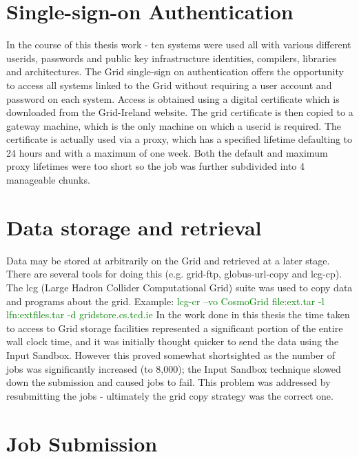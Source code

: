 \section{Single-sign-on Authentication}
In the course of this thesis work - ten systems were used all with various different userids, passwords and public key infrastructure identities, compilers, libraries and architectures. 
The Grid single-sign on authentication offers the opportunity to access all systems linked to the Grid without requiring a user account and password on each system.
Access is obtained using a digital certificate which is downloaded from the Grid-Ireland website.
The grid certificate is then copied to a gateway machine, which is the only machine on which a userid is required.
The certificate is actually used via a proxy, which has a specified lifetime defaulting to 24 hours and with a maximum of one week.
Both the default and maximum proxy lifetimes were too short so the job was further subdivided into 4 manageable chunks.

\section{Data storage and retrieval}
Data may be stored at arbitrarily on the Grid and retrieved at a later stage. 
There are several tools for doing this (e.g. grid-ftp, globus-url-copy and lcg-cp).
The lcg (Large Hadron Collider Computational Grid) suite was used to copy data and programs about the grid.
Example:
\textcolor{green}
{\textsf {
lcg-cr --vo CosmoGrid file:ext.tar  -l lfn:extfiles.tar -d gridstore.cs.tcd.ie
}}
In the work done in this thesis the time taken to access to Grid storage facilities represented a significant portion of the entire wall clock time, and it was initially thought quicker to send the data using the Input Sandbox.
However this proved somewhat shortsighted as the number of jobs was significantly increased (to 8,000); the Input Sandbox technique slowed down the submission and caused jobs to fail.
This problem was addressed by resubmitting the jobs - ultimately the grid copy strategy was the correct one.


\section{Job Submission}


